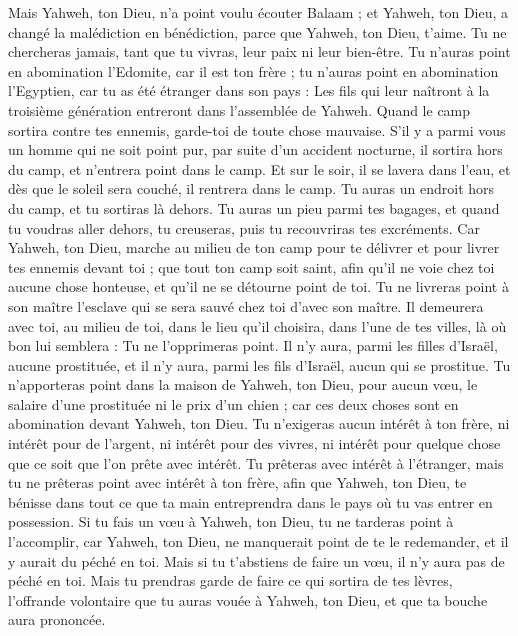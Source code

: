 \begin{multicols}{2}
Mais Yahweh, ton Dieu, n’a point voulu écouter Balaam ; et Yahweh, ton Dieu, a changé la malédiction en bénédiction, parce que Yahweh, ton Dieu, t'aime.
Tu ne chercheras jamais, tant que tu vivras, leur paix ni leur bien-être.
Tu n'auras point en abomination l'Edomite, car il est ton frère ; tu n'auras point en abomination l'Egyptien, car tu as été étranger dans son pays :
Les fils qui leur naîtront à la troisième génération entreront dans l'assemblée de Yahweh.
Quand le camp sortira contre tes ennemis, garde-toi de toute chose mauvaise.
S'il y a parmi vous un homme qui ne soit point pur, par suite d’un accident nocturne, il sortira hors du camp, et n'entrera point dans le camp.
Et sur le soir, il se lavera dans l’eau, et dès que le soleil sera couché, il rentrera dans le camp.
Tu auras un endroit hors du camp, et tu sortiras là dehors.
Tu auras un pieu parmi tes bagages, et quand tu voudras aller dehors, tu creuseras, puis tu recouvriras tes excréments.
Car Yahweh, ton Dieu, marche au milieu de ton camp pour te délivrer et pour livrer tes ennemis devant toi ; que tout ton camp soit saint, afin qu'il ne voie chez toi aucune chose honteuse, et qu'il ne se détourne point de toi.
Tu ne livreras point à son maître l’esclave qui se sera sauvé chez toi d'avec son maître.
Il demeurera avec toi, au milieu de toi, dans le lieu qu'il choisira, dans l'une de tes villes, là où bon lui semblera : Tu ne l’opprimeras point.
Il n’y aura, parmi les filles d'Israël, aucune prostituée, et il n’y aura, parmi les fils d’Israël, aucun qui se prostitue.
Tu n'apporteras point dans la maison de Yahweh, ton Dieu, pour aucun vœu, le salaire d'une prostituée ni le prix d'un chien ; car ces deux choses sont en abomination devant Yahweh, ton Dieu.
Tu n’exigeras aucun intérêt à ton frère, ni intérêt pour de l’argent, ni intérêt pour des vivres, ni intérêt pour quelque chose que ce soit que l'on prête avec intérêt.
Tu prêteras avec intérêt à l'étranger, mais tu ne prêteras point avec intérêt à ton frère, afin que Yahweh, ton Dieu, te bénisse dans tout ce que ta main entreprendra dans le pays où tu vas entrer en possession.
Si tu fais un vœu à Yahweh, ton Dieu, tu ne tarderas point à l'accomplir, car Yahweh, ton Dieu, ne manquerait point de te le redemander, et il y aurait du péché en toi.
Mais si tu t'abstiens de faire un vœu, il n'y aura pas de péché en toi.
Mais tu prendras garde de faire ce qui sortira de tes lèvres, l’offrande volontaire que tu auras vouée à Yahweh, ton Dieu, et que ta bouche aura prononcée.

\end{multicols}
